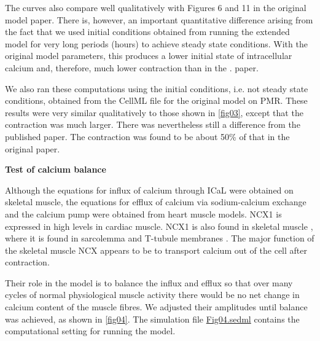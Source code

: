 \documentclass[fleqn,10pt]{physiome}
\begin{document}
The curves also compare well qualitatively with Figures 6 and 11 in the original model paper. There is, however, an important quantitative difference arising from the fact that we used initial conditions obtained from running the extended model for very long periods (hours) to achieve steady state conditions. With the original model parameters, this produces a lower initial state of intracellular calcium and, therefore, much lower contraction than in the \citet{shorten2007mathematical}. paper. 

We also ran these computations using the initial conditions, i.e. not steady state conditions, obtained from the CellML file for the original model on PMR. These results were very similar qualitatively to those shown in \autoref{fig03}, except that the contraction was much larger. There was nevertheless still a difference from the published \citet{shorten2007mathematical} paper. The contraction was found to be about 50\% of that in the original paper.

\textbf{Test of calcium balance}\newline

Although the equations for influx of calcium through ICaL were obtained on skeletal muscle, the equations for efflux of calcium via sodium-calcium exchange and the calcium pump were obtained from heart muscle models. NCX1 is expressed in high levels in cardiac muscle. NCX1 is also found in skeletal muscle \citep{cifuentes2000sodium}, where it is found in sarcolemma and T-tubule membranes \citep{sacchetto1996colocalization}. The major function of the skeletal muscle NCX appears to be to transport calcium out of the cell after contraction.\newline

Their role in the model is to balance the influx and efflux so that over many cycles of normal physiological muscle activity there would be no net change in calcium content of the muscle fibres. We adjusted their amplitudes until balance was achieved, as shown in \autoref{fig04}. The simulation file \href{https://models.physiomeproject.org/workspace/5c6/file/afd4d5cb20ecdcbc0b10198fe31795520488a34e/Fig04.sedml}{Fig04.sedml} contains the computational setting for running the model.
\end{document}
